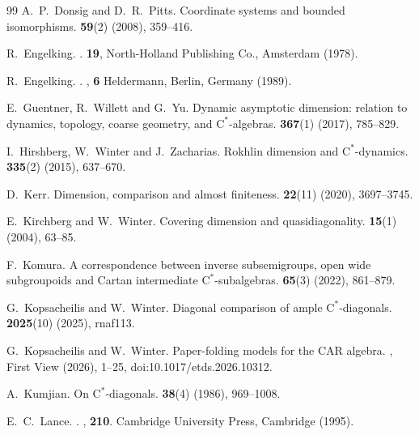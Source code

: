 \documentclass[11pt,a4paper]{amsart}
\theoremstyle{definition}
\numberwithin{equation}{section}
\begin{document}
\begin{thebibliography}{99}
A.\ P.\ Donsig and D.\ R.\ Pitts.
\newblock Coordinate systems and bounded isomorphisms.
 {\bf 59}(2) (2008), 359--416.

R.\ Engelking.
.
 {\bf 19}, North-Holland Publishing Co., Amsterdam (1978).

R.\  Engelking.
.
, {\bf 6} Heldermann, Berlin, Germany (1989).

E.\ Guentner, R.\ Willett and G.\ Yu.
\newblock Dynamic asymptotic dimension: relation to dynamics, topology, coarse geometry, and $\mathrm{C}^\ast$-algebras.
 {\bf 367}(1) (2017), 785--829.

I.\ Hirshberg, W.\ Winter and J.\ Zacharias.
\newblock Rokhlin dimension and $\mathrm{C}^\ast$-dynamics.
 {\bf 335}(2) (2015), 637--670.

D.\ Kerr.
\newblock Dimension, comparison and almost finiteness.
 {\bf 22}(11) (2020), 3697--3745.

E.\ Kirchberg and W.\ Winter.
\newblock Covering dimension and quasidiagonality.
 {\bf 15}(1) (2004), 63--85.



F.\ Komura.
\newblock A correspondence between inverse subsemigroups, open wide subgroupoids and Cartan intermediate $\mathrm{C}^\ast$-subalgebras.
 {\bf 65}(3) (2022), 861--879.

G.\ Kopsacheilis and W.\ Winter.
\newblock Diagonal comparison of ample $\mathrm{C}^\ast$-diagonals.
 {\bf 2025}(10) (2025), rnaf113.

G.\ Kopsacheilis and W.\ Winter.
\newblock Paper-folding models for the CAR algebra.
, First View (2026), 1--25,
doi:10.1017/etds.2026.10312.

A.\ Kumjian.
\newblock On $\mathrm{C}^*$-diagonals.
 {\bf 38}(4) (1986), 969--1008.

E.\ C.\ Lance.
.
, {\bf 210}. Cambridge University Press, Cambridge (1995).


\end{thebibliography}
\end{document}
